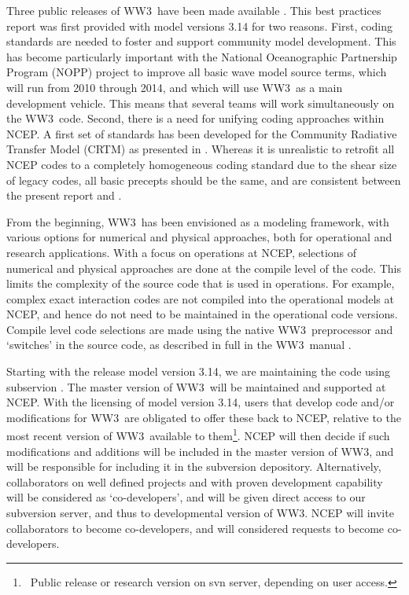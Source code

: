 \documentclass[12pt]{article}
\newcommand{\ws}{WW3}
\begin{document}
Three public releases of \ws\ have been made available
\citep{tol:OMB99a,tol:OMB02b, tol:MMAB09a}. This best practices report was
first provided with model versions 3.14 for two reasons. First, coding
standards are needed to foster and support community model development. This
has become particularly important with the National Oceanographic Partnership
Program (NOPP) project to improve all basic wave model source terms, which
will run from 2010 through 2014, and which will use \ws\ as a main development
vehicle. This means that several teams will work simultaneously on the \ws\
code. Second, there is a need for unifying coding approaches within NCEP. A
first set of standards has been developed for the Community Radiative Transfer
Model (CRTM) as presented in \cite{rep:PvD08}. Whereas it is unrealistic to
retrofit all NCEP codes to a completely homogeneous coding standard due to the
shear size of legacy codes, all basic precepts should be the same, and are
consistent between the present report and \cite{rep:PvD08}.

From the beginning, \ws\ has been envisioned as a modeling framework, with
various options for numerical and physical approaches, both for operational
and research applications. With a focus on operations at NCEP, selections of
numerical and physical approaches are done at the compile level of the
code. This limits the complexity of the source code that is used in
operations. For example, complex exact interaction codes are not compiled into
the operational models at NCEP, and hence do not need to be maintained in the
operational code versions. Compile level code selections are made using the
native \ws\ preprocessor and `switches' in the source code, as described in
full in the \ws\ manual \cite[or more recent versions]{tol:MMAB09a}.

Starting with the release model version 3.14, we are maintaining the code
using subservion \citep{bk:CSea06}. The master version of \ws\ will be
maintained and supported at NCEP. With the licensing of model version 3.14,
users that develop code and/or modifications for \ws\ are obligated to offer
these back to NCEP, relative to the most recent version of \ws\ available to
them\footnote{~Public release or research version on svn server, depending on
user access.}. NCEP will then decide if such modifications and additions will
be included in the master version of \ws, and will be responsible for
including it in the subversion depository. Alternatively, collaborators on
well defined projects and with proven development capability will be
considered as `co-developers', and will be given direct access to our
subversion server, and thus to developmental version of \ws. NCEP will invite
collaborators to become co-developers, and will considered requests to become
co-developers.
\end{document}
